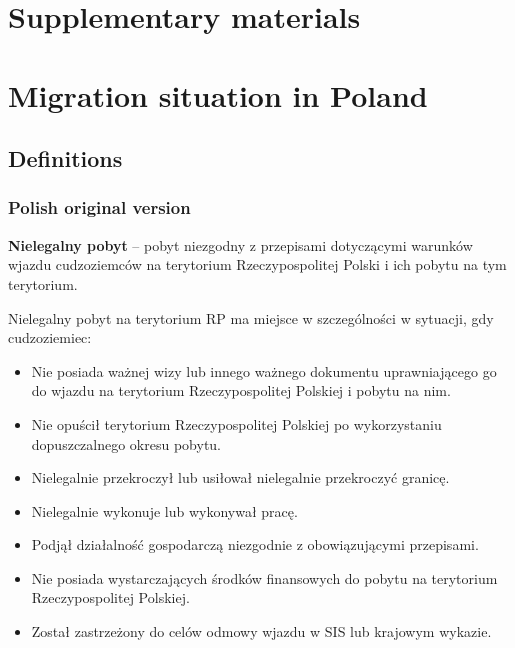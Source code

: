 \section*{Supplementary materials}\label{supplementary-materials-table-of-contents}

\renewcommand{\thetable}{S\arabic{table}}
\renewcommand{\thefigure}{S\arabic{figure}}

\setcounter{page}{1}
\startcontents[appendix]


\newpage

\section{Migration situation in
Poland}\label{sec-appen-migration-situation}

\subsection{Definitions}\label{sec-appen-definitions}

\subsubsection{Polish original version}\label{polish-original-version}

\textbf{Nielegalny pobyt} -- pobyt niezgodny z przepisami dotyczącymi
warunków wjazdu cudzoziemców na terytorium Rzeczypospolitej Polski i ich
pobytu na tym terytorium.

Nielegalny pobyt na terytorium RP ma miejsce w szczególności w sytuacji,
gdy cudzoziemiec:

\begin{itemize}
\tightlist
\item
  Nie posiada ważnej wizy lub innego ważnego dokumentu uprawniającego go
  do wjazdu na terytorium Rzeczypospolitej Polskiej i pobytu na nim.
\item
  Nie opuścił terytorium Rzeczypospolitej Polskiej po wykorzystaniu
  dopuszczalnego okresu pobytu.
\item
  Nielegalnie przekroczył lub usiłował nielegalnie przekroczyć granicę.
\item
  Nielegalnie wykonuje lub wykonywał pracę.
\item
  Podjął działalność gospodarczą niezgodnie z obowiązującymi przepisami.
\item
  Nie posiada wystarczających środków finansowych do pobytu na
  terytorium Rzeczypospolitej Polskiej.
\item
  Został zastrzeżony do celów odmowy wjazdu w SIS lub krajowym wykazie.
\end{itemize}

